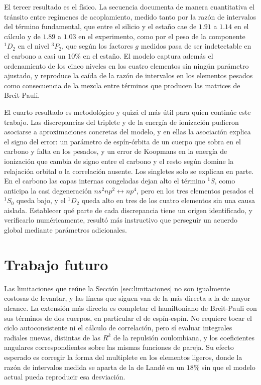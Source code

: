 El tercer resultado es el físico. La secuencia documenta de manera cuantitativa el tránsito entre regímenes de acoplamiento, medido tanto por la razón de intervalos del término fundamental, que entre el silicio y el estaño cae de $1.91$ a $1.14$ en el cálculo y de $1.89$ a $1.03$ en el experimento, como por el peso de la componente $^1D_2$ en el nivel $^3P_2$, que según los factores $g$ medidos pasa de ser indetectable en el carbono a casi un $10\%$ en el estaño. El modelo captura además el ordenamiento de los cinco niveles en los cuatro elementos sin ningún parámetro ajustado, y reproduce la caída de la razón de intervalos en los elementos pesados como consecuencia de la mezcla entre términos que producen las matrices de Breit-Pauli.

El cuarto resultado es metodológico y quizá el más útil para quien continúe este trabajo. Las discrepancias del triplete y de la energía de ionización pudieron asociarse a aproximaciones concretas del modelo, y en ellas la asociación explica el signo del error: un parámetro de espín-órbita de un cuerpo que sobra en el carbono y falta en los pesados, y un error de Koopmans en la energía de ionización que cambia de signo entre el carbono y el resto según domine la relajación orbital o la correlación ausente. Los singletes solo se explican en parte. En el carbono las capas internas congeladas dejan alto el término $^1S$, como anticipa la casi degeneración $ns^2np^2 \leftrightarrow np^4$, pero en los tres elementos pesados el $^1S_0$ queda bajo, y el $^1D_2$ queda alto en tres de los cuatro elementos sin una causa aislada. Establecer qué parte de cada discrepancia tiene un origen identificado, y verificarlo numéricamente, resultó más instructivo que perseguir un acuerdo global mediante parámetros adicionales.

\section{Trabajo futuro}
\label{sec:trabajo_futuro}

Las limitaciones que reúne la Sección \ref{sec:limitaciones} no son igualmente costosas de levantar, y las líneas que siguen van de la más directa a la de mayor alcance. La extensión más directa es completar el hamiltoniano de Breit-Pauli con sus términos de dos cuerpos, en particular el de espín-espín. No requiere tocar el ciclo autoconsistente ni el cálculo de correlación, pero sí evaluar integrales radiales nuevas, distintas de las $R^k$ de la repulsión coulombiana, y los coeficientes angulares correspondientes sobre las mismas funciones de pareja. Su efecto esperado es corregir la forma del multiplete en los elementos ligeros, donde la razón de intervalos medida se aparta de la de Landé en un $18\%$ sin que el modelo actual pueda reproducir esa desviación.

